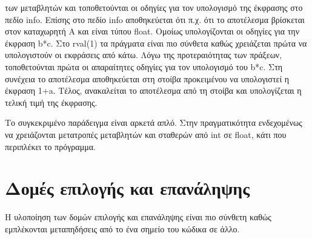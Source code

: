 \documentclass[12pt,a4paper]{report}
\begin{document}
των μεταβλητών και τοποθετούνται οι οδηγίες για τον υπολογισμό της έκφρασης στο 
πεδίο info. Επίσης στο πεδίο info αποθηκεύεται ότι π.χ. ότι το αποτέλεσμα βρίσκεται 
στον καταχωρητή A και είναι τύπου float. Ομοίως υπολογίζονται οι οδηγίες για την 
έκφραση b*c. Στο rval(1) τα πράγματα είναι πιο σύνθετα καθώς χρειάζεται πρώτα να 
υπολογιστούν οι εκφράσεις από κάτω. Λόγω της προτεραιότητας των πράξεων, τοποθετούνται 
πρώτα οι απαραίτητες οδηγίες για τον υπολογισμό του b*c. Στη συνέχεια το αποτέλεσμα 
αποθηκεύεται στη στοίβα προκειμένου να υπολογιστεί η έκφραση 1+a. Τέλος, ανακαλείται 
το αποτέλεσμα από τη στοίβα και υπολογίζεται η τελική τιμή της έκφρασης.
\par
Το συγκεκριμένο παράδειγμα είναι αρκετά απλό. Στην πραγματικότητα ενδεχομένως να 
χρειάζονται μετατροπές μεταβλητών και σταθερών από int σε float, κάτι που 
περιπλέκει το πρόγραμμα.
\section{Δομές επιλογής και επανάληψης}
Η υλοποίηση των δομών επιλογής και επανάληψης είναι πιο σύνθετη καθώς εμπλέκονται 
μεταπηδήσεις από το ένα σημείο του κώδικα σε άλλο.
\end{document}
